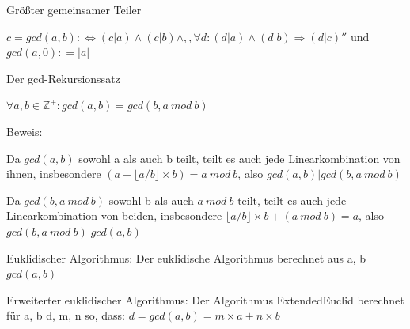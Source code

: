 \documentclass[a4paper]{article}
\begin{document}
\begin{multicols}{3}
      Größter gemeinsamer Teiler
      \begin{itemize*}
            \item $c = gcd(a, b) :\Leftrightarrow ( c | a) \wedge ( c | b) \wedge ,,\forall d: ( d | a ) \wedge ( d | b) \Rightarrow ( d | c )''$ und $gcd(a, 0 ) : = | a |$
            \item Der gcd-Rekursionssatz
            \begin{itemize*}
                  \item $\forall a, b \in \mathbb{Z}^+: gcd(a, b) = gcd(b, a\ mod\ b)$
                  \item Beweis:
                  \begin{itemize*}
                        \item Da $gcd(a, b)$ sowohl a als auch b teilt, teilt es auch jede Linearkombination von ihnen, insbesondere $(a- \lfloor a / b \rfloor \times b) = a\ mod\ b$, also $gcd(a, b) | gcd(b, a\ mod\ b)$
                        \item Da $gcd(b, a\ mod\ b)$ sowohl b als auch $a\ mod\ b$ teilt, teilt es auch jede Linearkombination von beiden, insbesondere $\lfloor a / b \rfloor \times b + (a\ mod\ b) = a$, also $gcd(b, a\ mod\ b) | gcd(a, b)$
                  \end{itemize*}
            \end{itemize*}
            \item Euklidischer Algorithmus: Der euklidische Algorithmus berechnet aus a, b $gcd(a, b)$
            \item Erweiterter euklidischer Algorithmus: Der Algorithmus ExtendedEuclid berechnet für a, b d, m, n so, dass: $d = gcd(a, b) = m \times a + n \times b$

\end{itemize*}
\end{multicols}
\end{document}
